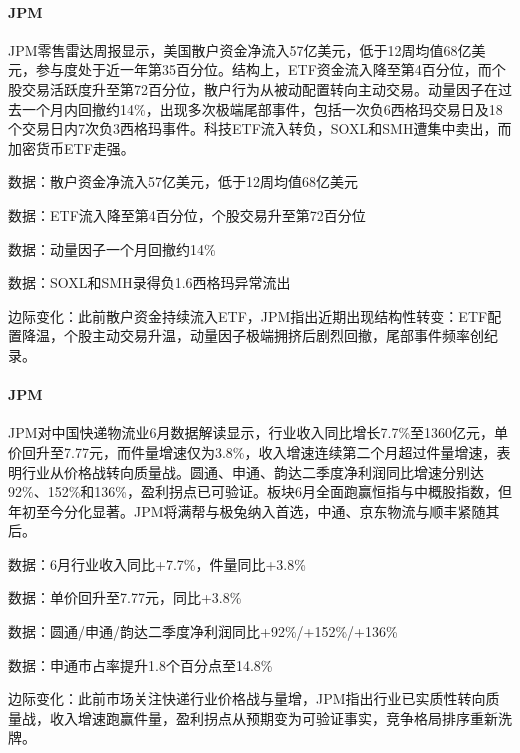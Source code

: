 \documentclass[11pt]{ctexart}
\begin{document}
\paragraph{JPM} JPM零售雷达周报显示，美国散户资金净流入57亿美元，低于12周均值68亿美元，参与度处于近一年第35百分位。结构上，ETF资金流入降至第4百分位，而个股交易活跃度升至第72百分位，散户行为从被动配置转向主动交易。动量因子在过去一个月内回撤约14\%，出现多次极端尾部事件，包括一次负6西格玛交易日及18个交易日内7次负3西格玛事件。科技ETF流入转负，SOXL和SMH遭集中卖出，而加密货币ETF走强。
{\small\color{refgray}数据：散户资金净流入57亿美元，低于12周均值68亿美元\par}
{\small\color{refgray}数据：ETF流入降至第4百分位，个股交易升至第72百分位\par}
{\small\color{refgray}数据：动量因子一个月回撤约14\%\par}
{\small\color{refgray}数据：SOXL和SMH录得负1.6西格玛异常流出\par}
{\small\color{refgray}边际变化：此前散户资金持续流入ETF，JPM指出近期出现结构性转变：ETF配置降温，个股主动交易升温，动量因子极端拥挤后剧烈回撤，尾部事件频率创纪录。\par}
\paragraph{JPM} JPM对中国快递物流业6月数据解读显示，行业收入同比增长7.7\%至1360亿元，单价回升至7.77元，而件量增速仅为3.8\%，收入增速连续第二个月超过件量增速，表明行业从价格战转向质量战。圆通、申通、韵达二季度净利润同比增速分别达92\%、152\%和136\%，盈利拐点已可验证。板块6月全面跑赢恒指与中概股指数，但年初至今分化显著。JPM将满帮与极兔纳入首选，中通、京东物流与顺丰紧随其后。
{\small\color{refgray}数据：6月行业收入同比+7.7\%，件量同比+3.8\%\par}
{\small\color{refgray}数据：单价回升至7.77元，同比+3.8\%\par}
{\small\color{refgray}数据：圆通/申通/韵达二季度净利润同比+92\%/+152\%/+136\%\par}
{\small\color{refgray}数据：申通市占率提升1.8个百分点至14.8\%\par}
{\small\color{refgray}边际变化：此前市场关注快递行业价格战与量增，JPM指出行业已实质性转向质量战，收入增速跑赢件量，盈利拐点从预期变为可验证事实，竞争格局排序重新洗牌。\par}
\end{document}
